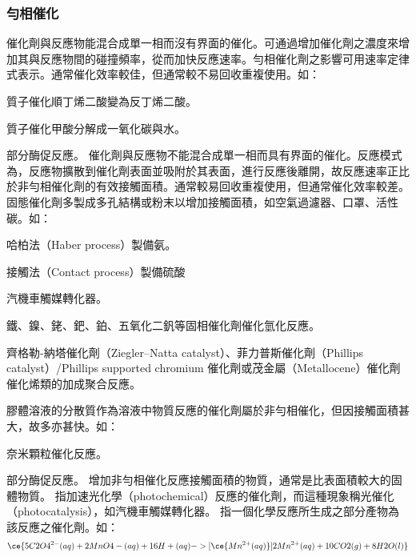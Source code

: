 \documentclass[a4paper,12pt]{report}
\begin{document}
\subsubsection{勻相催化}
催化劑與反應物能混合成單一相而沒有界面的催化。可通過增加催化劑之濃度來增加其與反應物間的碰撞頻率，從而加快反應速率。勻相催化劑之影響可用速率定律式表示。通常催化效率較佳，但通常較不易回收重複使用。如：
\bit
\item {}
\item {}
\item {}
\item 質子催化順丁烯二酸變為反丁烯二酸。
\item 質子催化甲酸分解成一氧化碳與水。
\item 部分酶促反應。
\eit
{}
催化劑與反應物不能混合成單一相而具有界面的催化。反應模式為，反應物擴散到催化劑表面並吸附於其表面，進行反應後離開，故反應速率正比於非勻相催化劑的有效接觸面積。通常較易回收重複使用，但通常催化效率較差。固態催化劑多製成多孔結構或粉末以增加接觸面積，如空氣過濾器、口罩、活性碳。如：
\bit
\item {}
\item {}
\item 哈柏法（Haber process）製備氨。
\item 接觸法（Contact process）製備硫酸
\item 汽機車觸媒轉化器。
\item 鐵、鎳、銠、鈀、鉑、五氧化二釩等固相催化劑催化氫化反應。
\item 齊格勒-納塔催化劑（Ziegler–Natta catalyst）、菲力普斯催化劑（Phillips catalyst）/Phillips supported chromium 催化劑或茂金屬（Metallocene）催化劑催化烯類的加成聚合反應。
\eit

膠體溶液的分散質作為溶液中物質反應的催化劑屬於非勻相催化，但因接觸面積甚大，故多亦甚快。如：
\bit
\item 奈米顆粒催化反應。
\item 部分酶促反應。
\eit
{}
增加非勻相催化反應接觸面積的物質，通常是比表面積較大的固體物質。
指加速光化學（photochemical）反應的催化劑，而這種現象稱光催化（photocatalysis），如汽機車觸媒轉化器。
指一個化學反應所生成之部分產物為該反應之催化劑。如：
\[\ce{5C2O4^{2-}(aq) + 2MnO4-(aq) + 16H+(aq) ->[\ce{Mn^{2+}(aq)}] 2Mn^{2+}(aq) + 10CO2(g) + 8H2O(l)}\]
\end{document}
